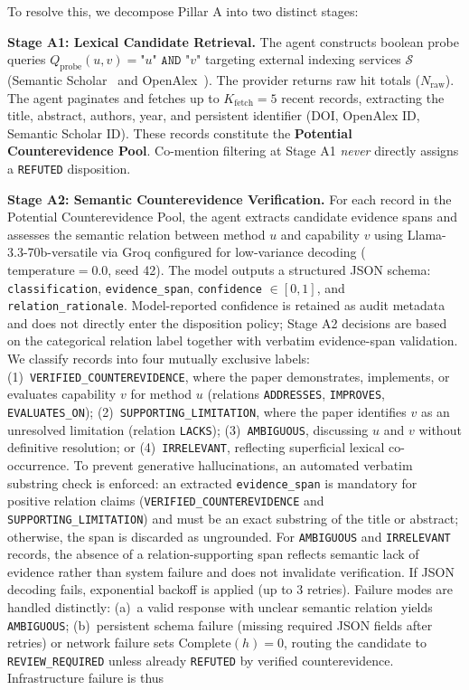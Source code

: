 \documentclass[runningheads]{llncs}
\begin{document}
To resolve this, we decompose Pillar A into two distinct stages:

\noindent\textbf{Stage A1: Lexical Candidate Retrieval.} The agent constructs boolean probe queries $Q_{\text{probe}}(u, v) = \texttt{"}u\texttt{" AND "}v\texttt{"}$ targeting external indexing services $\mathcal{S}$ (Semantic Scholar~\cite{semanticscholar2023} and OpenAlex~\cite{openalex2022}). The provider returns raw hit totals ($N_{\text{raw}}$). The agent paginates and fetches up to $K_{\text{fetch}} = 5$ recent records, extracting the title, abstract, authors, year, and persistent identifier (DOI, OpenAlex ID, Semantic Scholar ID). These records constitute the \textbf{Potential Counterevidence Pool}. Co-mention filtering at Stage A1 \emph{never} directly assigns a \texttt{REFUTED} disposition.

\noindent\textbf{Stage A2: Semantic Counterevidence Verification.} For each record in the Potential Counterevidence Pool, the agent extracts candidate evidence spans and assesses the semantic relation between method $u$ and capability $v$ using Llama-3.3-70b-versatile via Groq configured for low-variance decoding ($\text{temperature} = 0.0$, seed 42). The model outputs a structured JSON schema: \texttt{classification}, \texttt{evidence\_}\allowbreak\texttt{span}, \texttt{confidence} $\in [0, 1]$, and \texttt{relation\_}\allowbreak\texttt{rationale}. Model-reported confidence is retained as audit metadata and does not directly enter the disposition policy; Stage A2 decisions are based on the categorical relation label together with verbatim evidence-span validation. We classify records into four mutually exclusive labels: (1)~\texttt{VERIFIED\_}\allowbreak\texttt{COUNTEREVIDENCE}, where the paper demonstrates, implements, or evaluates capability $v$ for method $u$ (relations \texttt{ADDRESSES}, \texttt{IMPROVES}, \texttt{EVALUATES\_}\allowbreak\texttt{ON}); (2)~\texttt{SUPPORTING\_}\allowbreak\texttt{LIMITATION}, where the paper identifies $v$ as an unresolved limitation (relation \texttt{LACKS}); (3)~\texttt{AMBIGUOUS}, discussing $u$ and $v$ without definitive resolution; or (4)~\texttt{IRRELEVANT}, reflecting superficial lexical co-occurrence. To prevent generative hallucinations, an automated verbatim substring check is enforced: an extracted \texttt{evidence\_}\allowbreak\texttt{span} is mandatory for positive relation claims (\texttt{VERIFIED\_}\allowbreak\texttt{COUNTEREVIDENCE} and \texttt{SUPPORTING\_}\allowbreak\texttt{LIMITATION}) and must be an exact substring of the title or abstract; otherwise, the span is discarded as ungrounded. For \texttt{AMBIGUOUS} and \texttt{IRRELEVANT} records, the absence of a relation-supporting span reflects semantic lack of evidence rather than system failure and does not invalidate verification. If JSON decoding fails, exponential backoff is applied (up to 3 retries). Failure modes are handled distinctly: (a)~a valid response with unclear semantic relation yields \texttt{AMBIGUOUS}; (b)~persistent schema failure (missing required JSON fields after retries) or network failure sets $\text{Complete}(h) = 0$, routing the candidate to \texttt{REVIEW\_REQUIRED} unless already \texttt{REFUTED} by verified counterevidence. Infrastructure failure is thus 
\end{document}
